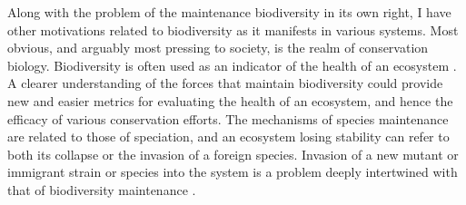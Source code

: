 Along with the problem of the maintenance biodiversity in its own right, I have other motivations related to biodiversity as it manifests in various systems. 
Most obvious, and arguably most pressing to society, is the realm of conservation biology. 
Biodiversity is often used as an indicator of the health of an ecosystem \cite{McKane2000,Pimm1988,Kalyuzhny2014,Peterson1997,Shaffer1981,Saavedra2013}. 
A clearer understanding of the forces that maintain biodiversity could provide new and easier metrics for evaluating the health of an ecosystem, and hence the efficacy of various conservation efforts.
The mechanisms of species maintenance are related to those of speciation, and an ecosystem losing stability can refer to both its collapse or the invasion of a foreign species. 
Invasion of a new mutant or immigrant strain or species into the system is a problem deeply intertwined with that of biodiversity maintenance \cite{Hubbell2001}. 


